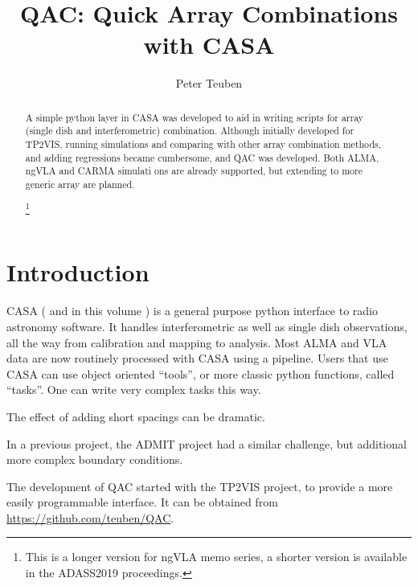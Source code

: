 \documentclass[11pt,twoside]{article}
\newif\ifadass
\begin{document}
\title{QAC: Quick Array Combinations with CASA}
\author{Peter Teuben
  }



\begin{abstract}

A simple python layer in CASA was developed to aid in writing scripts
for array (single dish and interferometric) combination. Although
initially developed for TP2VIS, running simulations and comparing
with other array combination methods, and adding regressions became
cumbersome, and QAC was developed. Both ALMA, ngVLA and CARMA simulati
ons are already supported, but extending to more generic array are
planned.

\ifadass
\else
\footnote{This is a longer version for ngVLA memo series, a shorter version is available in the ADASS2019 proceedings.}
\fi

\end{abstract}




\section{Introduction}

CASA (\citet{casa1} and in this volume \citet{casa2}) 
is a general purpose python interface to radio
astronomy software. It handles interferometric as well as single dish
observations, all the way from calibration and mapping to
analysis. Most ALMA and VLA data are now routinely processed with CASA
using a pipeline.  Users that use CASA can use object oriented
``tools'', or more classic python functions, called
``tasks''. One can write very complex tasks this way.

The effect of adding short spacings can be dramatic.

In a previous project, the ADMIT project had a similar challenge, but
additional more complex boundary conditions.

The development of QAC started with the TP2VIS project, to provide a
more easily programmable interface. It can be obtained from
\url{https://github.com/teuben/QAC}.
\end{document}
